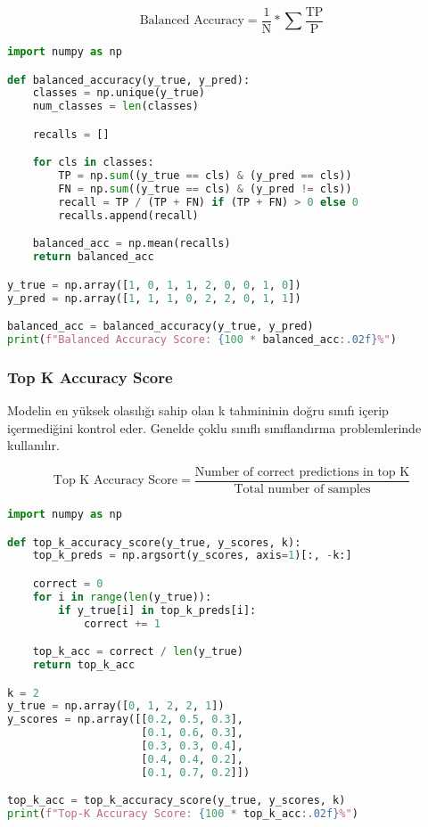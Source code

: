 \[\text{Balanced Accuracy} = \frac{1}{\text{N}} * \sum{\frac{\text{TP}}{\text{P}}}\]

\begin{lstlisting}[language=Python]
import numpy as np

def balanced_accuracy(y_true, y_pred):
    classes = np.unique(y_true)
    num_classes = len(classes)

    recalls = []

    for cls in classes:
        TP = np.sum((y_true == cls) & (y_pred == cls))
        FN = np.sum((y_true == cls) & (y_pred != cls))
        recall = TP / (TP + FN) if (TP + FN) > 0 else 0
        recalls.append(recall)

    balanced_acc = np.mean(recalls)
    return balanced_acc

y_true = np.array([1, 0, 1, 1, 2, 0, 0, 1, 0])
y_pred = np.array([1, 1, 1, 0, 2, 2, 0, 1, 1])

balanced_acc = balanced_accuracy(y_true, y_pred)
print(f"Balanced Accuracy Score: {100 * balanced_acc:.02f}%")
\end{lstlisting}

\newpage

\subsubsection{Top K Accuracy Score}

Modelin en yüksek olasılığı sahip olan k tahmininin doğru sınıfı içerip içermediğini kontrol eder. Genelde çoklu sınıflı sınıflandırma problemlerinde kullanılır.

\[\text{Top K Accuracy Score} = \frac{\text{Number of correct predictions in top K}}{\text{Total number of samples}}\]

\begin{lstlisting}[language=Python]
import numpy as np

def top_k_accuracy_score(y_true, y_scores, k):
    top_k_preds = np.argsort(y_scores, axis=1)[:, -k:]

    correct = 0
    for i in range(len(y_true)):
        if y_true[i] in top_k_preds[i]:
            correct += 1

    top_k_acc = correct / len(y_true)
    return top_k_acc

k = 2
y_true = np.array([0, 1, 2, 2, 1])
y_scores = np.array([[0.2, 0.5, 0.3],
                     [0.1, 0.6, 0.3],
                     [0.3, 0.3, 0.4],
                     [0.4, 0.4, 0.2],
                     [0.1, 0.7, 0.2]])

top_k_acc = top_k_accuracy_score(y_true, y_scores, k)
print(f"Top-K Accuracy Score: {100 * top_k_acc:.02f}%")
\end{lstlisting}

